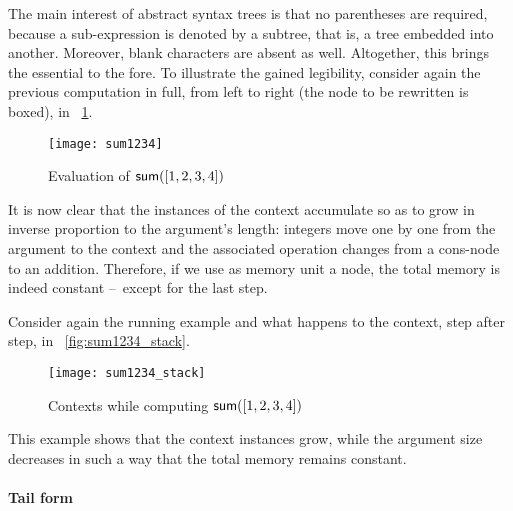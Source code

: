 The main interest of abstract syntax trees is that no parentheses are
required, because a sub\hyp{}expression is denoted by a subtree, that
is, a tree embedded into another. Moreover, blank characters are
absent as well. Altogether, this brings the essential to the fore. To
illustrate the gained legibility, consider again the previous
computation in full, from left to right (the node to be rewritten is
boxed), in \fig~\ref{fig:sum1234}.
\begin{figure}
\centering
\texttt{[image: sum1234]}
\caption{Evaluation of \(\textsf{sum}([1,2,3,4])\)\label{fig:sum1234}}
\end{figure}
It is now clear that the instances of the context accumulate so as to
grow in inverse proportion to the argument's length: integers move one
by one from the argument to the context and the associated operation
changes from a cons\hyp{}node to an
addition. Therefore, if we use as memory unit a node, the total memory
is indeed constant --~except for the last step.

Consider again the running example and what happens to the context,
step after step, in \fig~\vref{fig:sum1234_stack}.
\begin{figure}[t]
\centering
\texttt{[image: sum1234\_stack]}
\caption{Contexts while computing \(\textsf{sum}([1,2,3,4])\)
\label{fig:sum1234_stack}}
\end{figure}
This example shows that the context instances grow, while the argument
size decreases in such a way that the total memory remains constant.

\paragraph{Tail form}
\label{sec:tail}

